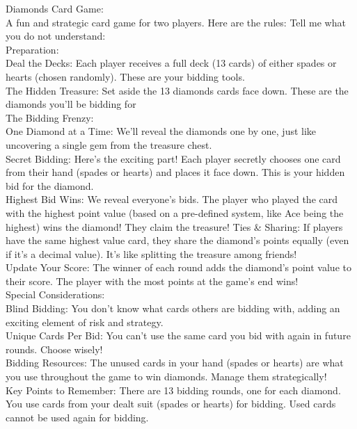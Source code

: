 \documentclass[runningheads]{llncs}
\begin{document}
\begin{thebibliography}{8}
Diamonds Card Game:\\
A fun and strategic card game for two players. 
Here are the rules: Tell me what you do not understand:\\
Preparation:\\
Deal the Decks: Each player receives a full deck (13 cards) of either spades or hearts (chosen randomly). These are your bidding tools.\\
The Hidden Treasure: Set aside the 13 diamonds cards face down. These are the diamonds you'll be bidding for\\
The Bidding Frenzy:\\
One Diamond at a Time: We'll reveal the diamonds one by one, just like uncovering a single gem from the treasure chest.\\
Secret Bidding: Here's the exciting part! Each player secretly chooses one card from their hand (spades or hearts) and places it face down. This is your hidden bid for the diamond.\\
Highest Bid Wins: We reveal everyone's bids. The player who played the card with the highest point value (based on a pre-defined system, like Ace being the highest) wins the diamond! They claim the treasure!
Ties \& Sharing: If players have the same highest value card, they share the diamond's points equally (even if it's a decimal value). It's like splitting the treasure among friends!\\
Update Your Score: The winner of each round adds the diamond's point value to their score. The player with the most points at the game's end wins!\\
Special Considerations:\\
Blind Bidding: You don't know what cards others are bidding with, adding an exciting element of risk and strategy.\\
Unique Cards Per Bid: You can't use the same card you bid with again in future rounds. Choose wisely!\\
Bidding Resources: The unused cards in your hand (spades or hearts) are what you use throughout the game to win diamonds. Manage them strategically!\\
Key Points to Remember:
There are 13 bidding rounds, one for each diamond.\\
You use cards from your dealt suit (spades or hearts) for bidding.
Used cards cannot be used again for bidding.\\

\end{thebibliography}
\end{document}
